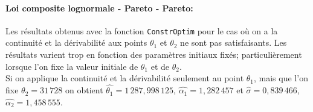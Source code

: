 		\paragraph{Loi composite lognormale - Pareto - Pareto:} Les résultats obtenus avec la fonction \texttt{ConstrOptim} pour le cas où on a la continuité et la dérivabilité aux points $\theta_1$ et $\theta_2$ ne sont pas satisfaisants. Les résultats varient trop en fonction des paramètres initiaux fixés; particulièrement lorsque l'on fixe la valeur initiale de $\theta_1$ et de $\theta_2$.\\
	
		Si on applique la continuité et la dérivabilité seulement au point $\theta_1$, mais que l'on fixe $\theta_2 = 31\,728 $ on obtient $\hat{\theta_1} =1\,287,998\,125 $, $\hat{\alpha_1} =  1,282\,457$ et $\hat{\sigma}= 0,839\,466$, $\hat{\alpha_2}=1,458\,555$.
	
